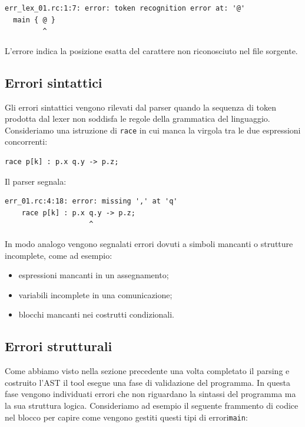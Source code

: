 \begin{tcolorbox}[colback=black!2,colframe=black!35,boxrule=0.4pt]
\begin{verbatim}
err_lex_01.rc:1:7: error: token recognition error at: '@'
  main { @ }
         ^
\end{verbatim}
\end{tcolorbox}
L’errore indica la posizione esatta del carattere non riconosciuto nel file sorgente.

\subsection*{Errori sintattici}

Gli errori sintattici vengono rilevati dal parser quando la sequenza di token prodotta dal lexer non soddisfa le regole della grammatica del linguaggio.
Consideriamo una istruzione di \texttt{race} in cui manca la virgola tra le due espressioni concorrenti:

\begin{tcolorbox}[colback=white,colframe=black!35,boxrule=0.4pt]
\begin{lstlisting}
race p[k] : p.x q.y -> p.z;
\end{lstlisting}
\end{tcolorbox}
Il parser segnala:

\begin{tcolorbox}[colback=black!2,colframe=black!35,boxrule=0.4pt]
\begin{verbatim}
err_01.rc:4:18: error: missing ',' at 'q'
    race p[k] : p.x q.y -> p.z;
                    ^
\end{verbatim}
\end{tcolorbox}
In modo analogo vengono segnalati errori dovuti a simboli mancanti o strutture incomplete, come ad esempio:

\begin{itemize}
\item espressioni mancanti in un assegnamento;
\item variabili incomplete in una comunicazione;
\item blocchi mancanti nei costrutti condizionali.
\end{itemize}

\subsection*{Errori strutturali}

Come abbiamo visto nella sezione precedente una volta completato il parsing e costruito l’AST il tool esegue una fase di validazione del programma. In questa fase vengono individuati errori che non riguardano la sintassi del programma ma la sua struttura logica.
Consideriamo ad esempio il seguente frammento di codice nel blocco per capire come vengono gestiti questi tipi di errori\texttt{main}:

